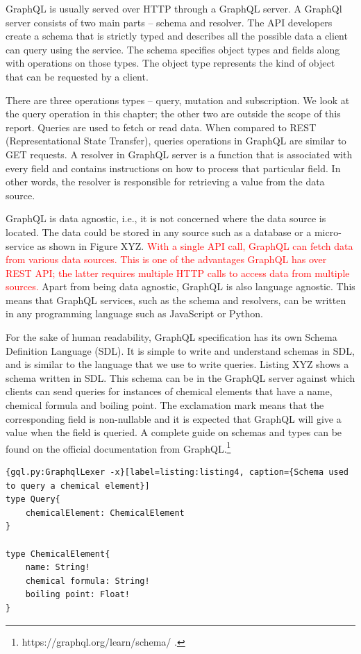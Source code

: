 GraphQL is usually served over HTTP through a GraphQL server. A GraphQl server consists of two main parts – schema and resolver. The API developers create a schema that is strictly typed and describes all the possible data a client can query using the service. The schema specifies object types and fields along with operations on those types. The object type represents the kind of object that can be requested by a client. 

There are three operations types – query, mutation and subscription.  We look at the query operation in this chapter; the other two are outside the scope of this report. Queries are used to fetch or read data. When compared to REST (Representational State Transfer),  queries operations in GraphQL are similar to GET requests. A resolver in GraphQL server is a function that is associated with every field and contains instructions on how to process that particular field. In other words, the resolver is responsible for retrieving a value from the data source. 

GraphQL is data agnostic, i.e., it is not concerned where the data source is located. The data could be stored in any source such as a database or a micro-service as shown in Figure XYZ. \textcolor{red}{With a single API call, GraphQL can fetch data from various data sources. This is one of the advantages GraphQL has over REST API; the latter requires multiple HTTP calls to access data from multiple sources.} Apart from being data agnostic, GraphQL is also language agnostic. This means that GraphQL services, such as the schema and resolvers, can be written in any programming language such as JavaScript or Python. 

For the sake of human readability, GraphQL specification has its own Schema Definition Language (SDL). It is simple to write and understand schemas in SDL, and is similar to the language that we use to write queries. Listing XYZ shows a schema written in SDL. This schema can be in the GraphQL server against which clients can send queries for instances of chemical elements that have a name, chemical formula and boiling point. The exclamation mark means that the corresponding field is non-nullable and it is expected that GraphQL will give a value when the field is queried. A complete guide on schemas and types can be found on the official documentation from GraphQL.\footnote{https://graphql.org/learn/schema/ .} 

\begin{minipage}{\linewidth}
\begin{lstlisting}{gql.py:GraphqlLexer -x}[label=listing:listing4, caption={Schema used to query a chemical element}]
type Query{
	chemicalElement: ChemicalElement
}

type ChemicalElement{
	name: String!
	chemical formula: String!
	boiling point: Float!
}

\end{lstlisting}
\end{minipage}

